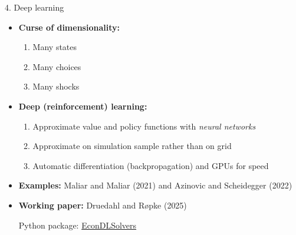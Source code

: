\documentclass[
  10pt,
  ignorenonframetext,
  aspectratio=43,
  english,
  handout]{beamer}
\providecommand{\tightlist}{%
  \setlength{\itemsep}{0pt}\setlength{\parskip}{0pt}}
\begin{document}
\begin{frame}{4. Deep learning}
\protect{}\label{deep-learning}
\begin{itemize}
\item
  \textbf{Curse of dimensionality:}

  \begin{enumerate}
  \tightlist
  \item
    Many states
  \item
    Many choices
  \item
    Many shocks
  \end{enumerate}
\item
  \textbf{Deep (reinforcement) learning:}

  \begin{enumerate}
  \tightlist
  \item
    Approximate value and policy functions with \emph{neural networks}
  \item
    Approximate on simulation sample rather than on grid
  \item
    Automatic differentiation (backpropagation) and GPUs for speed
  \end{enumerate}
\item
  \textbf{Examples:} Maliar and Maliar (2021) and Azinovic and
  Scheidegger (2022)
\item
  \textbf{Working paper:} Druedahl and Røpke (2025)

  Python package:
  \href{https://github.com/NumEconCopenhagen/EconDLSolvers}{EconDLSolvers}
\end{itemize}
\end{frame}
\end{document}
